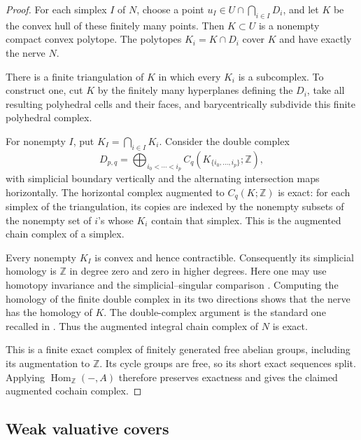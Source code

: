 \documentclass[11pt]{article}
\theoremstyle{definition}
\theoremstyle{remark}
\DeclareMathOperator{\Hom}{Hom}
\newcommand{\ZZ}{\mathbb Z}
\begin{document}
\begin{proof}
For each simplex \(I\) of \(N\), choose a point
\(u_I\in U\cap\bigcap_{i\in I}D_i\), and let \(K\) be the convex hull
of these finitely many points. Then \(K\subset U\) is a nonempty
compact convex polytope. The polytopes \(K_i=K\cap D_i\) cover \(K\)
and have exactly the nerve \(N\).

There is a finite triangulation of \(K\) in which every \(K_i\) is
a subcomplex. To construct one, cut \(K\) by the finitely many
hyperplanes defining the \(D_i\), take all resulting polyhedral
cells and their faces, and barycentrically subdivide this finite
polyhedral complex.

For nonempty \(I\), put \(K_I=\bigcap_{i\in I}K_i\). Consider the
double complex
\[
D_{p,q}=
\bigoplus_{i_0<\cdots<i_p}
C_q(K_{\{i_0,\ldots,i_p\}};\ZZ),
\]
with simplicial boundary vertically and the alternating
intersection maps horizontally. The horizontal complex augmented
to \(C_q(K;\ZZ)\) is exact: for each simplex of the triangulation,
its copies are indexed by the nonempty subsets of the nonempty
set of \(i\)'s whose \(K_i\) contain that simplex. This is the
augmented chain complex of a simplex.

Every nonempty \(K_I\) is convex and hence contractible.
Consequently its simplicial homology is \(\ZZ\) in degree zero
and zero in higher degrees. Here one may use homotopy invariance
and the simplicial--singular comparison
\cite[Theorems~2.10 and~2.27]{Hatcher}.
Computing the homology of the finite double complex in its two
directions shows that the nerve has the homology of \(K\).
The double-complex argument is the standard one recalled in
\cite[Tag~012X]{Stacks}.
Thus the augmented integral chain complex of \(N\) is exact.

This is a finite exact complex of finitely generated free abelian
groups, including its augmentation to \(\ZZ\). Its cycle groups
are free, so its short exact sequences split. Applying
\(\Hom_{\ZZ}(-,A)\) therefore preserves exactness and gives the
claimed augmented cochain complex.
\end{proof}

\subsection{Weak valuative covers}
\end{document}
